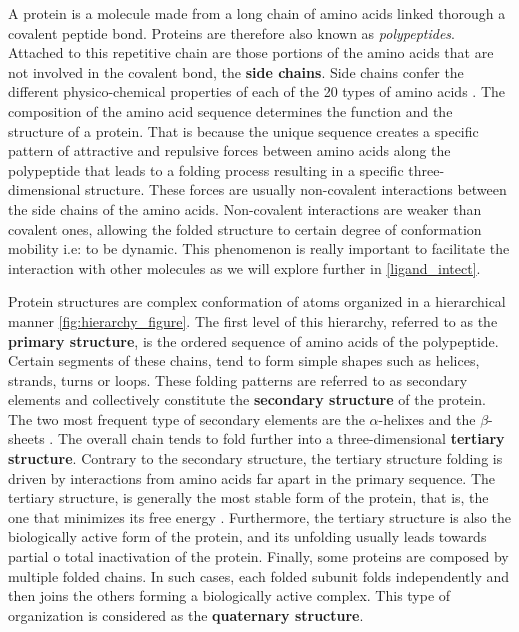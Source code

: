 \documentclass[12pt, a4paper,twoside]{tesi_upf}
\begin{document}
\par A protein is a molecule made from a long chain of amino acids linked thorough a covalent peptide bond. Proteins are therefore also known as \textit{polypeptides}. Attached to this repetitive chain are those portions of the amino acids that are not involved in the covalent bond, the \textbf{side chains}. Side chains confer the different physico-chemical properties of each of the 20 types of amino acids \cite{thecell2008}. The composition of the amino acid sequence determines the function and the structure of a protein. That is because the unique sequence creates a specific pattern of attractive and repulsive forces between amino acids along the polypeptide that leads to a folding process resulting in a specific three-dimensional structure. These forces are usually non-covalent  interactions between the side chains of the amino acids. Non-covalent interactions are weaker than covalent ones, allowing the folded structure to certain degree of  conformation mobility i.e: to be dynamic. This phenomenon is really important to facilitate the interaction with other molecules as we will explore further in \ref{ligand_intect}.  
\par Protein structures are complex conformation of atoms organized in a hierarchical manner \ref{fig:hierarchy_figure}. The first level of this hierarchy, referred to as the \textbf{primary structure}, is the ordered sequence of amino acids of the polypeptide. Certain segments of these chains, tend to form simple shapes such as helices, strands, turns or loops.  These folding patterns are referred to as secondary elements and collectively constitute the \textbf{secondary structure} of the protein. The two most frequent type of secondary elements are the $\alpha$-helixes and the $\beta$-sheets \cite{DSSP}. The overall chain tends to fold further into a three-dimensional  \textbf{tertiary structure}. Contrary to the secondary structure, the tertiary structure folding is driven by interactions from amino acids far apart in the primary sequence. The tertiary structure, is generally the most stable form of the protein, that is, the one that minimizes its free energy \cite{Dill1990}. Furthermore, the tertiary structure is also the biologically active form of the protein, and its unfolding usually leads towards partial o total inactivation of the protein. Finally, some proteins are composed by multiple folded chains. In such cases, each folded subunit folds independently and then joins the others forming a biologically active complex. This type of organization is considered as the \textbf{quaternary structure}.
\end{document}
